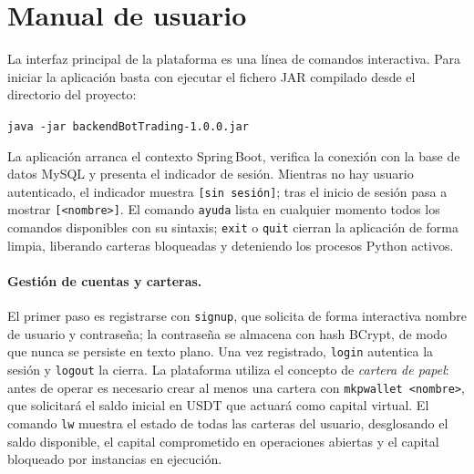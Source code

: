 \section{Manual de usuario}
\label{sec:manual}

La interfaz principal de la plataforma es una línea de comandos interactiva. Para
iniciar la aplicación basta con ejecutar el fichero JAR compilado desde el directorio
del proyecto:

\begin{center}
    \texttt{java -jar backendBotTrading-1.0.0.jar}
\end{center}

La aplicación arranca el contexto Spring\,Boot, verifica la conexión con la base de
datos MySQL y presenta el indicador de sesión. Mientras no hay usuario autenticado,
el indicador muestra \texttt{[sin sesión]}; tras el inicio de sesión pasa a mostrar
\texttt{[<nombre>]}. El comando \texttt{ayuda} lista en cualquier momento todos los
comandos disponibles con su sintaxis; \texttt{exit} o \texttt{quit} cierran la
aplicación de forma limpia, liberando carteras bloqueadas y deteniendo los procesos
Python activos.

\paragraph{Gestión de cuentas y carteras.}
El primer paso es registrarse con \texttt{signup}, que solicita de forma interactiva
nombre de usuario y contraseña; la contraseña se almacena con hash BCrypt, de modo
que nunca se persiste en texto plano. Una vez registrado, \texttt{login} autentica la
sesión y \texttt{logout} la cierra. La plataforma utiliza el concepto de
\textit{cartera de papel}: antes de operar es necesario crear al menos una cartera
con \texttt{mkpwallet <nombre>}, que solicitará el saldo inicial en USDT que actuará
como capital virtual. El comando \texttt{lw} muestra el estado de todas las carteras
del usuario, desglosando el saldo disponible, el capital comprometido en operaciones
abiertas y el capital bloqueado por instancias en ejecución.

